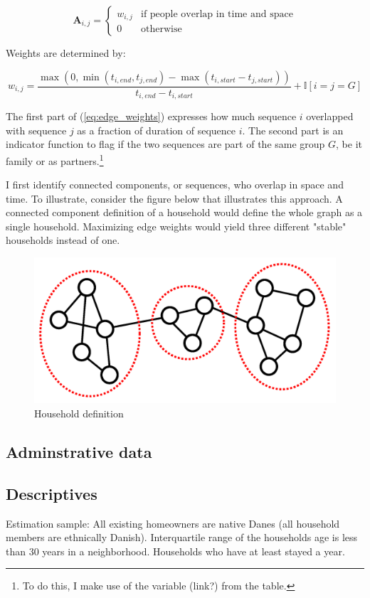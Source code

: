 \documentclass[main.tex]{subfiles}
\begin{document}
\begin{equation}
    \mathbf{A}_{i,j} = \begin{cases}
        w_{i,j} & \text{if people overlap in time and space} \\
        0 & \text{otherwise}
    \end{cases}
\end{equation}

Weights are determined by:

\begin{equation}
    w_{i, j} = \frac{\max(0 , \min(t_{i,end}, t_{j, end}) -\max(t_{i,start}-t_{j, start}))}{t_{i,end}-t_{i,start}} + \mathbb{I}[i=j=G]
    \label{eq:edge_weights}
\end{equation}

The first part of (\ref{eq:edge_weights}) expresses how much sequence $i$ overlapped with sequence $j$ as a fraction of duration of sequence $i$. The second part is an indicator function to flag if the two sequences are part of the same group $G$, be it family or as partners.\footnote{To do this, I make use of the  variable (link?) from the  table.}

I first identify connected components, or sequences, who overlap in space and time. To illustrate, consider the figure below that illustrates this approach. A connected component definition of a household would define the whole graph as a single household. Maximizing edge weights would yield three different "stable" households instead of one.
\begin{figure}[H]
    \centering
    \caption{Household definition}
    \includegraphics[width=0.4\linewidth]{figs/temporal_community_detection.png}
\end{figure}


\subsection{Adminstrative data}

\subsection{Descriptives}
Estimation sample: 
All existing homeowners are native Danes (all household members are ethnically Danish). Interquartile range of the households age is less than 30 years in a neighborhood. Households who have at least stayed a year. 
\end{document}
